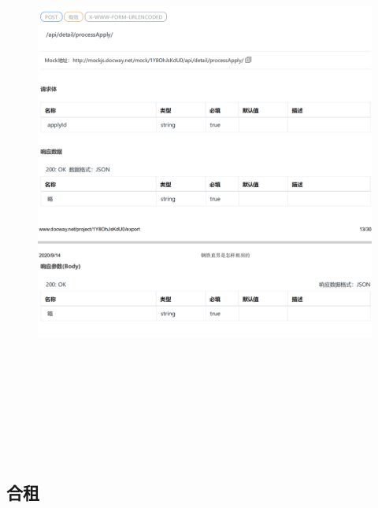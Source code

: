                         \begin{figure}[h]
                            \centering
                            \includegraphics[height=19.0cm,width=14.0cm]{design/image/api13.png} 
                            \end{figure}  
                            \newpage  
        \subsection{合租}
